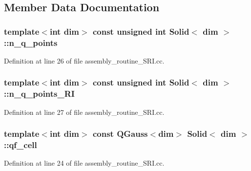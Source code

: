 \subsection{Member Data Documentation}
\subsubsection[{\texorpdfstring{n\+\_\+q\+\_\+points}{n_q_points}}]{\setlength{\rightskip}{0pt plus 5cm}template$<$int dim$>$ const unsigned int {\bf Solid}$<$ dim $>$\+::n\+\_\+q\+\_\+points\hspace{0.3cm}{\ttfamily [private]}}\hypertarget{classSolid_ae5a57e65024a6a944d6b7fdbefe7d758}{}\label{classSolid_ae5a57e65024a6a944d6b7fdbefe7d758}


Definition at line 26 of file assembly\+\_\+routine\+\_\+\+S\+R\+I.\+cc.

\subsubsection[{\texorpdfstring{n\+\_\+q\+\_\+points\+\_\+\+RI}{n_q_points_RI}}]{\setlength{\rightskip}{0pt plus 5cm}template$<$int dim$>$ const unsigned int {\bf Solid}$<$ dim $>$\+::n\+\_\+q\+\_\+points\+\_\+\+RI\hspace{0.3cm}{\ttfamily [private]}}\hypertarget{classSolid_a2a85d197b565f9a057f90e72e8d20560}{}\label{classSolid_a2a85d197b565f9a057f90e72e8d20560}


Definition at line 27 of file assembly\+\_\+routine\+\_\+\+S\+R\+I.\+cc.

\subsubsection[{\texorpdfstring{qf\+\_\+cell}{qf_cell}}]{\setlength{\rightskip}{0pt plus 5cm}template$<$int dim$>$ const Q\+Gauss$<$dim$>$ {\bf Solid}$<$ dim $>$\+::qf\+\_\+cell\hspace{0.3cm}{\ttfamily [private]}}\hypertarget{classSolid_adcd7596f6521749c8a4c7ffda312df8c}{}\label{classSolid_adcd7596f6521749c8a4c7ffda312df8c}


Definition at line 24 of file assembly\+\_\+routine\+\_\+\+S\+R\+I.\+cc.

